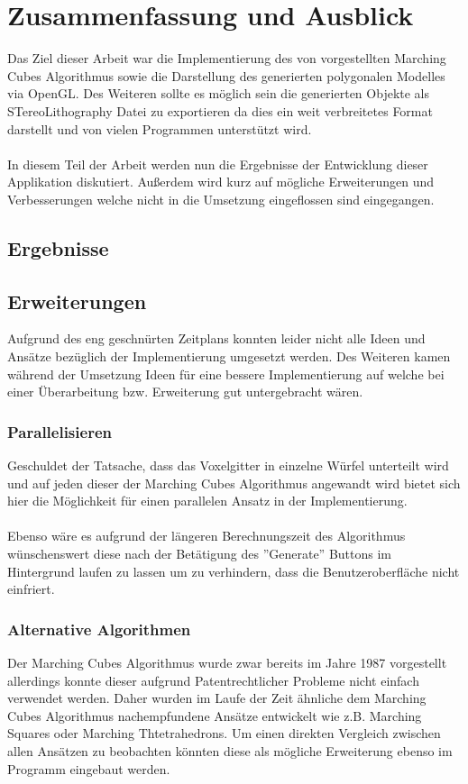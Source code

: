 \chapter{Zusammenfassung und Ausblick}
Das Ziel dieser Arbeit war die Implementierung des von \citep{MCAlgo} vorgestellten Marching Cubes Algorithmus sowie die Darstellung des generierten polygonalen Modelles via OpenGL. Des Weiteren sollte es möglich sein die generierten Objekte als STereoLithography Datei zu exportieren da dies ein weit verbreitetes Format darstellt und von vielen Programmen unterstützt wird.\\
\\
In diesem Teil der Arbeit werden nun die Ergebnisse der Entwicklung dieser Applikation diskutiert. Außerdem wird kurz auf mögliche Erweiterungen und Verbesserungen welche nicht in die Umsetzung eingeflossen sind eingegangen.

\section{Ergebnisse}

\section{Erweiterungen}
Aufgrund des eng geschnürten Zeitplans konnten leider nicht alle Ideen und Ansätze bezüglich der Implementierung umgesetzt werden. Des Weiteren kamen während der Umsetzung Ideen für eine bessere Implementierung auf welche bei einer Überarbeitung bzw. Erweiterung gut untergebracht wären.
\subsection{Parallelisieren}
Geschuldet der Tatsache, dass das Voxelgitter in einzelne Würfel unterteilt wird und auf jeden dieser der Marching Cubes Algorithmus angewandt wird bietet sich hier die Möglichkeit für einen parallelen Ansatz in der Implementierung.\\
\\
Ebenso wäre es aufgrund der längeren Berechnungszeit des Algorithmus wünschenswert diese nach der Betätigung des ''Generate'' Buttons im Hintergrund laufen zu lassen um zu verhindern, dass die Benutzeroberfläche nicht einfriert.
\subsection{Alternative Algorithmen}
Der Marching Cubes Algorithmus wurde zwar bereits im Jahre 1987 vorgestellt allerdings konnte dieser aufgrund Patentrechtlicher Probleme nicht einfach verwendet werden. Daher wurden im Laufe der Zeit ähnliche dem Marching Cubes Algorithmus nachempfundene Ansätze entwickelt wie z.B. Marching Squares oder Marching Thtetrahedrons. Um einen direkten Vergleich zwischen allen Ansätzen zu beobachten könnten diese als mögliche Erweiterung ebenso im Programm eingebaut werden.
